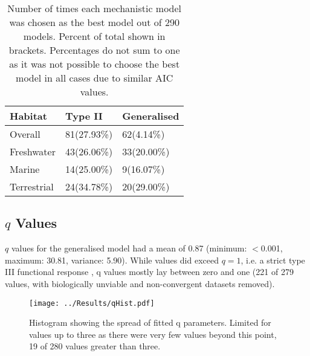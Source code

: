 \documentclass[a4paper]{article}
\numberwithin{equation}{section}
\begin{document}
\begin{center}
	\begin{table}[!h]
		\caption{Number of times each mechanistic model was chosen as the best model out of 290 models.  Percent of total shown in brackets.  Percentages do not sum to one as it was not possible to choose the best model in all cases due to similar AIC values.}
		\label{mechanistic table}
		\vspace{2mm}
		\begin{tabular}{|| p{1.8cm} |p{1.8cm} | p{1.8cm}||} 
			\hline
			Habitat & Type II & Generalised \\  
			\hline\hline
			Overall & 81(27.93\%) & 62(4.14\%)\\ 
			
			Freshwater & 43(26.06\%) & 33(20.00\%)\\
			
			Marine & 14(25.00\%) & 9(16.07\%)\\
			
			Terrestrial & 24(34.78\%) & 20(29.00\%)\\
			\hline
		\end{tabular}
	\end{table}	
\end{center}

\subsection{$q$ Values}
$q$ values for the generalised model had a mean of 0.87 (minimum: $<$0.001, maximum: 30.81, variance: 5.90).  While values did exceed $q=1$, i.e. a strict type III functional response \citep{Rosenbaum2018}, q values mostly lay between zero and one (221 of 279 values, with biologically unviable and non-convergent datasets removed).
\begin{center}
	\begin{figure}[H]
		\caption{Histogram showing the spread of fitted q parameters.  Limited for values up to three as there were very few values beyond this point, 19 of 280 values greater than three.}
		\vspace{1cm}
		\texttt{[image: ../Results/qHist.pdf]}
	\end{figure}
\end{center}

\newpage
\end{document}
